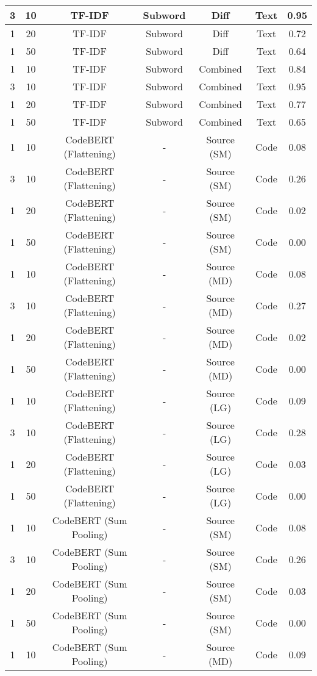 \begin{longtable}{|c|c|c|c|c|c|c|}
\hline
3 & 10 & TF-IDF & Subword & Diff & Text & 0.95 \\
\hline
1 & 20 & TF-IDF & Subword & Diff & Text & 0.72 \\
\hline
1 & 50 & TF-IDF & Subword & Diff & Text & 0.64 \\
\hline
1 & 10 & TF-IDF & Subword & Combined & Text & 0.84 \\
\hline
3 & 10 & TF-IDF & Subword & Combined & Text & 0.95 \\
\hline
1 & 20 & TF-IDF & Subword & Combined & Text & 0.77 \\
\hline
1 & 50 & TF-IDF & Subword & Combined & Text & 0.65 \\
\hline
1 & 10 & CodeBERT (Flattening) & - & Source (SM) & Code & 0.08 \\
\hline
3 & 10 & CodeBERT (Flattening) & - & Source (SM) & Code & 0.26 \\
\hline
1 & 20 & CodeBERT (Flattening) & - & Source (SM) & Code & 0.02 \\
\hline
1 & 50 & CodeBERT (Flattening) & - & Source (SM) & Code & 0.00 \\
\hline
1 & 10 & CodeBERT (Flattening) & - & Source (MD) & Code & 0.08 \\
\hline
3 & 10 & CodeBERT (Flattening) & - & Source (MD) & Code & 0.27 \\
\hline
1 & 20 & CodeBERT (Flattening) & - & Source (MD) & Code & 0.02 \\
\hline
1 & 50 & CodeBERT (Flattening) & - & Source (MD) & Code & 0.00 \\
\hline
1 & 10 & CodeBERT (Flattening) & - & Source (LG) & Code & 0.09 \\
\hline
3 & 10 & CodeBERT (Flattening) & - & Source (LG) & Code & 0.28 \\
\hline
1 & 20 & CodeBERT (Flattening) & - & Source (LG) & Code & 0.03 \\
\hline
1 & 50 & CodeBERT (Flattening) & - & Source (LG) & Code & 0.00 \\
\hline
1 & 10 & CodeBERT (Sum Pooling) & - & Source (SM) & Code & 0.08 \\
\hline
3 & 10 & CodeBERT (Sum Pooling) & - & Source (SM) & Code & 0.26 \\
\hline
1 & 20 & CodeBERT (Sum Pooling) & - & Source (SM) & Code & 0.03 \\
\hline
1 & 50 & CodeBERT (Sum Pooling) & - & Source (SM) & Code & 0.00 \\
\hline
1 & 10 & CodeBERT (Sum Pooling) & - & Source (MD) & Code & 0.09 \\

\end{longtable}
